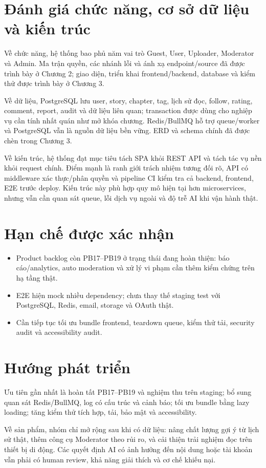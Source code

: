 \section{Đánh giá chức năng, cơ sở dữ liệu và kiến trúc}

Về chức năng, hệ thống bao phủ năm vai trò Guest, User, Uploader, Moderator và Admin. Ma trận quyền, các nhánh lỗi và ánh xạ endpoint/source đã được trình bày ở Chương 2; giao diện, triển khai frontend/backend, database và kiểm thử được trình bày ở Chương 3. 

Về dữ liệu, PostgreSQL lưu user, story, chapter, tag, lịch sử đọc, follow, rating, comment, report, audit và dữ liệu liên quan; transaction được dùng cho nghiệp vụ cần tính nhất quán như mở khóa chương. Redis/BullMQ hỗ trợ queue/worker và PostgreSQL vẫn là nguồn dữ liệu bền vững. ERD và schema chính đã được chèn trong Chương 3.

Về kiến trúc, hệ thống đạt mục tiêu tách SPA khỏi REST API và tách tác vụ nền khỏi request chính. Điểm mạnh là ranh giới trách nhiệm tương đối rõ, API có middleware xác thực/phân quyền và pipeline CI kiểm tra cả backend, frontend, E2E trước deploy. Kiến trúc này phù hợp quy mô hiện tại hơn microservices, nhưng vẫn cần quan sát queue, lỗi dịch vụ ngoài và độ trễ AI khi vận hành thật.

\section{Hạn chế được xác nhận}

\begin{itemize}
  \item Product backlog còn PB17--PB19 ở trạng thái đang hoàn thiện: báo cáo/analytics, auto moderation và xử lý vi phạm cần thêm kiểm chứng trên hạ tầng thật.
  \item E2E hiện mock nhiều dependency; chưa thay thế staging test với PostgreSQL, Redis, email, storage và OAuth thật.  

  \item Cần tiếp tục tối ưu bundle frontend, teardown queue, kiểm thử tải, security audit và accessibility audit.
\end{itemize}

\section{Hướng phát triển}

Ưu tiên gần nhất là hoàn tất PB17--PB19 và nghiệm thu trên staging; bổ sung quan sát Redis/BullMQ, log có cấu trúc và cảnh báo; tối ưu bundle bằng lazy loading; tăng kiểm thử tích hợp, tải, bảo mật và accessibility.

Về sản phẩm, nhóm chỉ mở rộng sau khi có dữ liệu: nâng chất lượng gợi ý từ lịch sử thật, thêm công cụ Moderator theo rủi ro, và cải thiện trải nghiệm đọc trên thiết bị di động. Các quyết định AI có ảnh hưởng đến nội dung hoặc tài khoản vẫn phải có human review, khả năng giải thích và cơ chế khiếu nại.


